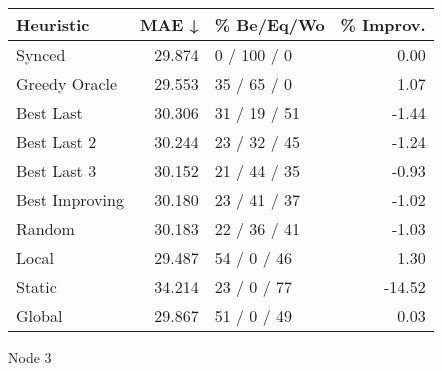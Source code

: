\begin{tabular}{lrlr}
\toprule
\textbf{Heuristic} & \textbf{MAE ↓} & \textbf{\% Be/Eq/Wo} & \textbf{\% Improv.} \\
\midrule
            Synced &         29.874 &          0 / 100 / 0 &                0.00 \\
     Greedy Oracle &         29.553 &          35 / 65 / 0 &                1.07 \\
         Best Last &         30.306 &         31 / 19 / 51 &               -1.44 \\
       Best Last 2 &         30.244 &         23 / 32 / 45 &               -1.24 \\
       Best Last 3 &         30.152 &         21 / 44 / 35 &               -0.93 \\
    Best Improving &         30.180 &         23 / 41 / 37 &               -1.02 \\
            Random &         30.183 &         22 / 36 / 41 &               -1.03 \\
             Local &         29.487 &          54 / 0 / 46 &                1.30 \\
            Static &         34.214 &          23 / 0 / 77 &              -14.52 \\
            Global &         29.867 &          51 / 0 / 49 &                0.03 \\
\bottomrule
\end{tabular}
\caption{Node 3}
\label{tab:non_lr05_le1_bs4_3}
